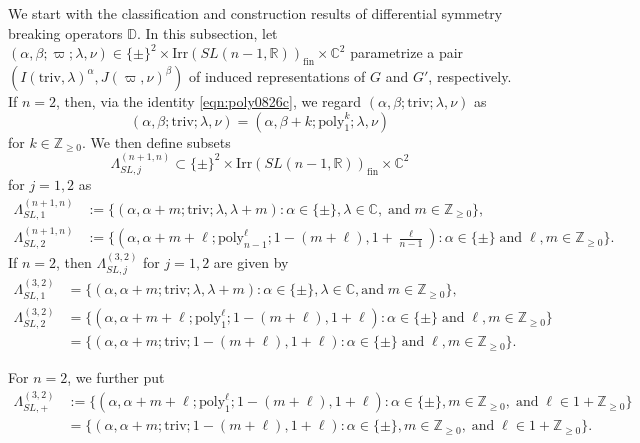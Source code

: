 \documentclass[reqno,11pt]{amsart}
\theoremstyle{remark}
\theoremstyle{definition}
\numberwithin{equation}{section}
\newcommand{\gb}{\beta}
\newcommand{\ga}{\alpha}
\newcommand{\gL}{\Lambda}
\newcommand{\R}{\mathbb{R}}
\newcommand{\C}{\mathbb{C}}
\newcommand{\Z}{\mathbb{Z}}
\newcommand{\poly}{\mathrm{poly}}
\newcommand{\Irr}{\mathrm{Irr}}
\newcommand{\triv}{\mathrm{triv}}
\newcommand{\fin}{\mathrm{fin}}
\newcommand{\bD}{\mathbb{D}}
\begin{document}
We start with the classification and construction results of 
differential symmetry breaking operators $\bD$.
In this subsection,
let $(\ga, \gb;\varpi;\lambda,\nu) \in \{\pm\}^2 \times \Irr(SL(n-1,\R))_{\fin} \times \C^2$ parametrize a pair $(I(\triv,\lambda)^\ga, J(\varpi,\nu)^\beta)$ of induced representations
of $G$ and $G'$, respectively. 
If $n=2$, then, via the identity \eqref{eqn:poly0826c}, we regard
$(\ga,\gb;\triv;\lambda,\nu)$ as 
\begin{equation}\label{eqn:poly0826d}
(\ga,\gb;\triv;\lambda,\nu) = (\ga,\gb+k;\poly^k_1;\lambda,\nu)
\end{equation}
for $k \in \Z_{\geq 0}$. 
We then define subsets
\begin{equation*}
\gL^{(n+1,n)}_{SL,j}\subset \{\pm\}^2 \times \Irr(SL(n-1,\R))_{\fin} \times \C^2
\end{equation*}
for $j=1,2$ as
\begin{align}
\gL^{(n+1,n)}_{SL,1}&:=\{
(\alpha, \alpha+m;\triv; \lambda, 
\lambda+m) : \alpha \in \{\pm\}, \lambda \in \C, \; \text{and} \; m\in \Z_{\geq 0}\},
\label{eqn:SL1}\\[3pt]
\gL^{(n+1,n)}_{SL,2}&:=\{
(\alpha, \alpha+m+\ell;\poly_{n-1}^\ell; 1-(m+\ell), 
1+\tfrac{\ell}{n-1}) : \alpha \in \{\pm\} \; \text{and} \; \ell, m\in \Z_{\geq 0}\}.
\label{eqn:SL2}
\end{align}
If $n=2$, then $\gL^{(3,2)}_{SL,j}$ for $j=1,2$ are given by
\begin{align}
\gL^{(3,2)}_{SL,1}&=\{
(\alpha, \alpha+m;\triv;\lambda, \lambda+m)
: \alpha \in \{\pm\}, \lambda \in \C,\text{and} \; m\in \Z_{\geq 0}\},\label{eqn:SL1b}\\[3pt]
\gL^{(3,2)}_{SL,2}
&=\{
(\alpha, \alpha+m+\ell; \poly^\ell_1; 1-(m+\ell), 1+\ell) :
 \alpha \in \{\pm\} \; \text{and} \; \ell, m\in \Z_{\geq 0}\}\label{eqn:SL2b}\\
&=\{
(\alpha, \alpha+m; \triv; 1-(m+\ell), 1+\ell) :
 \alpha \in \{\pm\} \; \text{and} \; \ell, m\in \Z_{\geq 0}\}.\label{eqn:SL2c}
\end{align}

For $n=2$, we further put
\begin{align}\label{eqn:SL3}
\gL^{(3,2)}_{SL,+}
&:=\{
(\alpha, \alpha+m+\ell; \poly^\ell_1; 1-(m+\ell), 1+\ell) : 
\alpha \in \{\pm\}, m\in \Z_{\geq 0}, \; \text{and} \; \ell\in 1+\Z_{\geq 0}\}\\
&=\{
(\alpha, \alpha+m; \triv; 1-(m+\ell), 1+\ell) : 
\alpha \in \{\pm\}, m\in \Z_{\geq 0}, \; \text{and} \; \ell\in 1+\Z_{\geq 0}\}.
\end{align}
\end{document}
